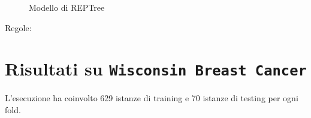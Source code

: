 \scriptsize

\begin{mdframed}[frametitle=Esecuzione REPTree]
	\scriptsize
\end{mdframed}


\begin{figure}[htb]
	\caption{Modello di REPTree}
\end{figure}

\begin{mdframed}[frametitle=Esecuzione JRip]
	\scriptsize
\end{mdframed}


\noindent
\normalsize Regole:
\scriptsize

\pagebreak

\section{Risultati su \texttt{Wisconsin Breast Cancer}}

\normalsize L'esecuzione ha coinvolto 629 istanze di training e 70 istanze di testing per ogni fold.


\begin{mdframed}[frametitle=Esecuzione NaiveBayesSimple]
	\footnotesize
\end{mdframed}


\footnotesize

\begin{mdframed}[frametitle=Esecuzione REPTree]
	\footnotesize
\end{mdframed}


